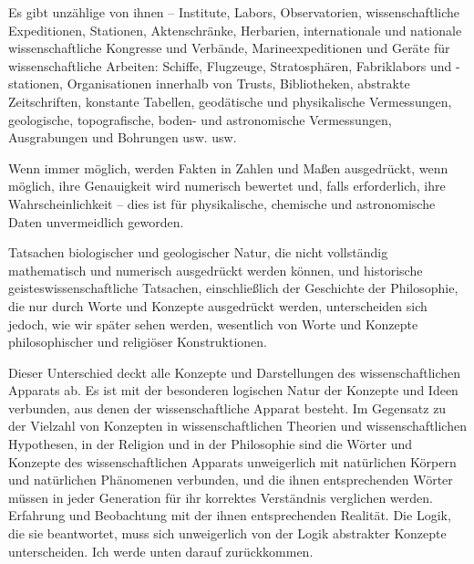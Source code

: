 \documentclass[11pt,a4paper]{book}
\begin{document}
Es gibt unzählige von ihnen -- Institute, Labors, Observatorien, wissenschaftliche Expeditionen, Stationen, Aktenschränke, Herbarien, internationale und nationale wissenschaftliche Kongresse und Verbände, Marineexpeditionen und Geräte für wissenschaftliche Arbeiten: Schiffe, Flugzeuge, Stratosphären, Fabriklabors und -stationen, Organisationen innerhalb von Trusts, Bibliotheken, abstrakte Zeitschriften, konstante Tabellen, geodätische und physikalische Vermessungen, geologische, topografische, boden- und astronomische Vermessungen, Ausgrabungen und Bohrungen usw. usw.



Wenn immer möglich, werden Fakten in Zahlen und Maßen ausgedrückt, wenn möglich, ihre Genauigkeit wird numerisch bewertet und, falls erforderlich, ihre Wahrscheinlichkeit -- dies ist für physikalische, chemische und astronomische Daten unvermeidlich geworden.



Tatsachen biologischer und geologischer Natur, die nicht vollständig mathematisch und numerisch ausgedrückt werden können, und historische geisteswissenschaftliche Tatsachen, einschließlich der Geschichte der Philosophie, die nur durch Worte und Konzepte ausgedrückt werden, unterscheiden sich jedoch, wie wir später sehen werden, wesentlich von Worte und Konzepte philosophischer und religiöser Konstruktionen.



Dieser Unterschied deckt alle Konzepte und Darstellungen des wissenschaftlichen Apparats ab. Es ist mit der besonderen logischen Natur der Konzepte und Ideen verbunden, aus denen der wissenschaftliche Apparat besteht. Im Gegensatz zu der Vielzahl von Konzepten in wissenschaftlichen Theorien und wissenschaftlichen Hypothesen, in der Religion und in der Philosophie sind die Wörter und Konzepte des wissenschaftlichen Apparats unweigerlich mit natürlichen Körpern und natürlichen Phänomenen verbunden, und die ihnen entsprechenden Wörter müssen in jeder Generation für ihr korrektes Verständnis verglichen werden. Erfahrung und Beobachtung mit der ihnen entsprechenden Realität. Die Logik, die sie beantwortet, muss sich unweigerlich von der Logik abstrakter Konzepte unterscheiden. Ich werde unten darauf zurückkommen.
\end{document}
